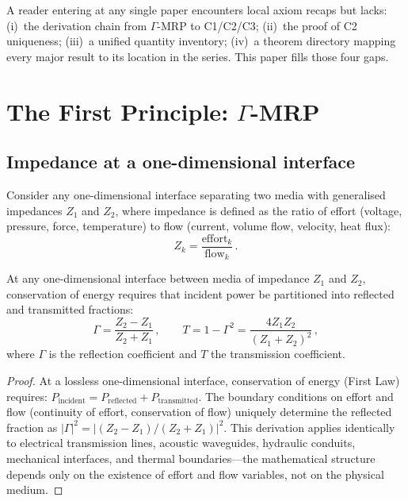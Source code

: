 \documentclass[aps,pre,twocolumn,superscriptaddress,floatfix]{revtex4-2}
\begin{document}
\noindent
A reader entering at any single paper encounters local
axiom recaps but lacks:
(i)~the derivation chain from $\Gamma$-MRP to C1/C2/C3;
(ii)~the proof of C2 uniqueness;
(iii)~a unified quantity inventory;
(iv)~a theorem directory mapping every major result to
its location in the series.
This paper fills those four gaps.


\section{The First Principle: $\Gamma$-MRP}
\label{sec:gamma}

\subsection{Impedance at a one-dimensional interface}

Consider any one-dimensional interface separating two
media with generalised impedances $Z_1$ and $Z_2$,
where impedance is defined as the ratio of effort
(voltage, pressure, force, temperature) to flow
(current, volume flow, velocity, heat flux):
\begin{equation}
  Z_k = \frac{\text{effort}_k}{\text{flow}_k}\,.
  \label{eq:Z-def}
\end{equation}

\begin{theorem}
\label{thm:gamma}
At any one-dimensional interface between media of
impedance $Z_1$ and $Z_2$, conservation of energy
requires that incident power be partitioned into
reflected and transmitted fractions:
\begin{equation}
  \Gamma = \frac{Z_2 - Z_1}{Z_2 + Z_1}\,,
  \qquad
  T = 1 - \Gamma^2 = \frac{4 Z_1 Z_2}{(Z_1 + Z_2)^2}\,,
  \label{eq:gamma-def}
\end{equation}
where $\Gamma$ is the reflection coefficient and $T$
the transmission coefficient.
\end{theorem}

\begin{proof}
At a lossless one-dimensional interface, conservation
of energy (First Law) requires:
$P_{\text{incident}} = P_{\text{reflected}} +
P_{\text{transmitted}}$.
The boundary conditions on effort and flow
(continuity of effort, conservation of flow)
uniquely determine the reflected fraction as
$|\Gamma|^2 = |(Z_2-Z_1)/(Z_2+Z_1)|^2$.
This derivation applies identically to electrical
transmission lines, acoustic waveguides, hydraulic
conduits, mechanical interfaces, and thermal
boundaries---the mathematical structure depends only
on the existence of effort and flow variables, not
on the physical medium.
\end{proof}
\end{document}
